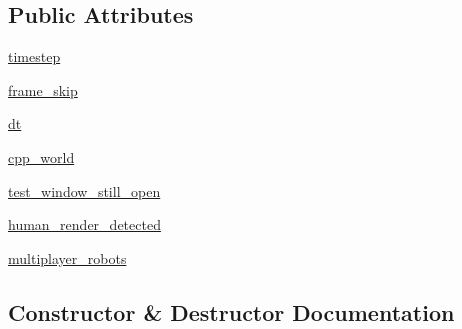 \subsection*{Public Attributes}
\begin{DoxyCompactItemize}
\item 
\hyperlink{classpybullet-gym_1_1pybulletgym_1_1envs_1_1roboschool_1_1scenes_1_1scene__bases_1_1_scene_a1997157029b12afc5cb924a639af5df3}{timestep}
\item 
\hyperlink{classpybullet-gym_1_1pybulletgym_1_1envs_1_1roboschool_1_1scenes_1_1scene__bases_1_1_scene_a63b6f349e603e5ad932f74fdcdb90ce9}{frame\+\_\+skip}
\item 
\hyperlink{classpybullet-gym_1_1pybulletgym_1_1envs_1_1roboschool_1_1scenes_1_1scene__bases_1_1_scene_ab39827eebd93dd56f188976fc89c4c77}{dt}
\item 
\hyperlink{classpybullet-gym_1_1pybulletgym_1_1envs_1_1roboschool_1_1scenes_1_1scene__bases_1_1_scene_ae01dd62f3d4a504bbbe0383f05688eee}{cpp\+\_\+world}
\item 
\hyperlink{classpybullet-gym_1_1pybulletgym_1_1envs_1_1roboschool_1_1scenes_1_1scene__bases_1_1_scene_ac95f7a610a1a8ccc6eb246a6b07a4f2c}{test\+\_\+window\+\_\+still\+\_\+open}
\item 
\hyperlink{classpybullet-gym_1_1pybulletgym_1_1envs_1_1roboschool_1_1scenes_1_1scene__bases_1_1_scene_a96d39562a6c4e03505395e2ab546508f}{human\+\_\+render\+\_\+detected}
\item 
\hyperlink{classpybullet-gym_1_1pybulletgym_1_1envs_1_1roboschool_1_1scenes_1_1scene__bases_1_1_scene_a369efdb2bc1cd063d835abcf72576dd1}{multiplayer\+\_\+robots}
\end{DoxyCompactItemize}


\subsection{Constructor \& Destructor Documentation}
